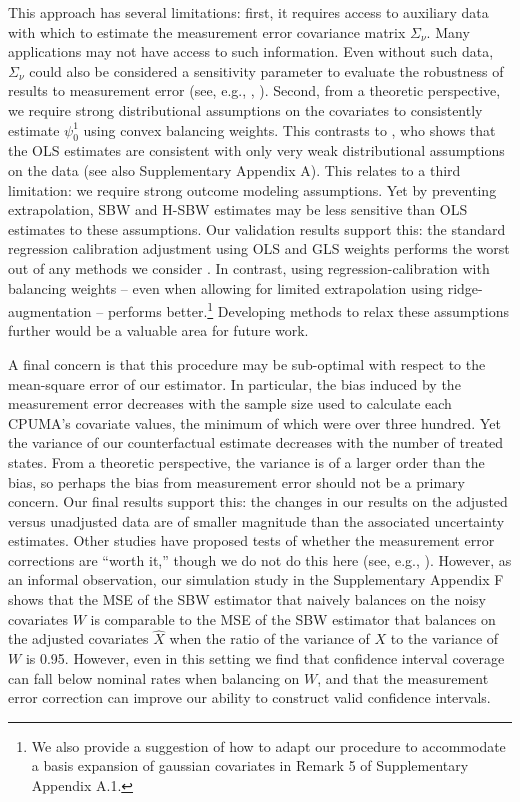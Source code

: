 \documentclass[aoas]{imsart}
\theoremstyle{plain}
\theoremstyle{remark}
\begin{document}
This approach has several limitations: first, it requires access to auxiliary data with which to estimate the measurement error covariance matrix $\Sigma_{\nu}$. Many applications may not have access to such information. Even without such data, $\Sigma_{\nu}$ could also be considered a sensitivity parameter to evaluate the robustness of results to measurement error (see, e.g., \citet{huque2014impact}, \citet{illenberger2020impact}). Second, from a theoretic perspective, we require strong distributional assumptions on the covariates to consistently estimate $\psi_0^1$ using convex balancing weights. This contrasts to \citet{gleser1992importance}, who shows that the OLS estimates are consistent with only very weak distributional assumptions on the data (see also Supplementary Appendix A). This relates to a third limitation: we require strong outcome modeling assumptions. Yet by preventing extrapolation, SBW and H-SBW estimates may be less sensitive than OLS estimates to these assumptions. Our validation results support this: the standard regression calibration adjustment using OLS and GLS weights performs the worst out of any methods we consider \citep{supplement}. In contrast, using regression-calibration with balancing weights -- even when allowing for limited extrapolation using ridge-augmentation -- performs better.\footnote{We also provide a suggestion of how to adapt our procedure to accommodate a basis expansion of gaussian covariates in Remark 5 of Supplementary Appendix A.1.} Developing methods to relax these assumptions further would be a valuable area for future work.

A final concern is that this procedure may be sub-optimal with respect to the mean-square error of our estimator. In particular, the bias induced by the measurement error decreases with the sample size used to calculate each CPUMA's covariate values, the minimum of which were over three hundred. Yet the variance of our counterfactual estimate decreases with the number of treated states. From a theoretic perspective, the variance is of a larger order than the bias, so perhaps the bias from measurement error should not be a primary concern. Our final results support this: the changes in our results on the adjusted versus unadjusted data are of smaller magnitude than the associated uncertainty estimates. Other studies have proposed tests of whether the measurement error corrections are ``worth it,'' though we do not do this here (see, e.g., \citet{gleser1992importance}). However, as an informal observation, our simulation study in the Supplementary Appendix F shows that the MSE of the SBW estimator that naively balances on the noisy covariates $W$ is comparable to the MSE of the SBW estimator that balances on the adjusted covariates $\hat{X}$ when the ratio of the variance of $X$ to the variance of $W$ is 0.95. However, even in this setting we find that confidence interval coverage can fall below nominal rates when balancing on $W$, and that the measurement error correction can improve our ability to construct valid confidence intervals.
\end{document}
